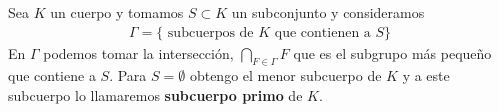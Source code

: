 \begin{definicion}
    Sea $K$ un cuerpo y tomamos $S\subset K$ un subconjunto y consideramos
    \begin{gather*}
        \Gamma = \{\text{ subcuerpos de }K \text{ que contienen a }S\}
    \end{gather*}
    En $\Gamma$ podemos tomar la intersección, $\bigcap\limits_{F\in\Gamma}F$ que es el subgrupo más pequeño que contiene a $S$. Para $S=\emptyset$ obtengo el menor subcuerpo de $K$ y a este subcuerpo lo llamaremos \textbf{subcuerpo primo} de $K$.
\end{definicion}

